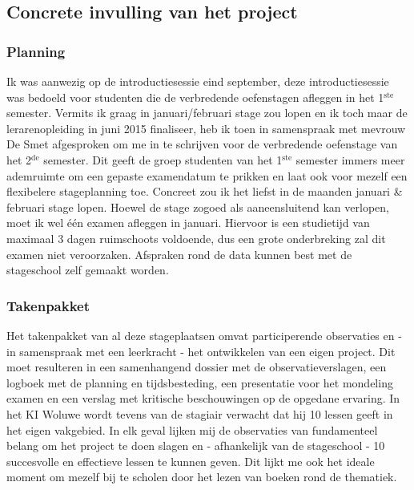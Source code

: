 \documentclass[a4paper,11pt]{article}
\theoremstyle{definition}
\begin{document}
\subsection{Concrete invulling van het project}
\subsubsection{Planning}
Ik was aanwezig op de introductiesessie eind september, deze introductiesessie 
was bedoeld voor studenten die de verbredende oefenstagen afleggen in het 1$^\text{ste}$ 
semester. Vermits ik graag in januari/februari stage zou lopen en ik toch maar 
de lerarenopleiding in juni 2015 finaliseer, heb ik toen in samenspraak met 
mevrouw De Smet afgesproken om me in te schrijven voor de verbredende oefenstage van het 2$^\text{de}$ semester. Dit
geeft de groep studenten van het 1$^\text{ste}$ semester immers meer ademruimte 
om een gepaste examendatum te prikken en laat ook voor mezelf een 
flexibelere stageplanning toe. Concreet zou ik het liefst in de maanden januari \& februari stage lopen.
Hoewel de stage zogoed als aaneensluitend kan verlopen, moet ik wel één examen afleggen in januari. Hiervoor
is een studietijd van maximaal 3 dagen ruimschoots voldoende, dus een grote onderbreking zal dit examen niet veroorzaken. Afspraken rond de data kunnen best met de stageschool zelf gemaakt worden.
\subsubsection{Takenpakket}
Het takenpakket van al deze stageplaatsen omvat participerende observaties en - in 
samenspraak met een leerkracht - het ontwikkelen van een eigen project. Dit moet 
resulteren in een samenhangend dossier met de observatieverslagen, een logboek met de 
planning en tijdsbesteding, een presentatie voor het mondeling examen en 
een verslag met kritische beschouwingen op de opgedane ervaring. In het KI 
Woluwe wordt tevens van de stagiair verwacht dat hij 10 lessen geeft in het 
eigen vakgebied. In elk geval lijken mij de observaties van fundamenteel belang 
om het project te doen slagen en - afhankelijk van de stageschool - 10 
succesvolle en effectieve lessen te kunnen geven. Dit lijkt me ook het ideale 
moment om mezelf bij te scholen door het lezen van boeken rond de thematiek.
\end{document}
